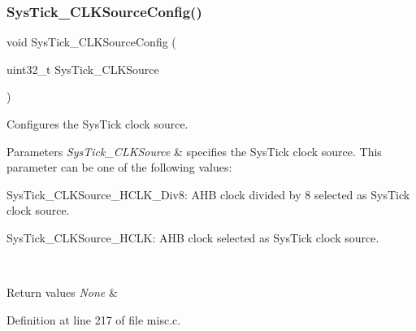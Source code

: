 \subsubsection{\texorpdfstring{Sys\+Tick\+\_\+\+C\+L\+K\+Source\+Config()}{SysTick\_CLKSourceConfig()}}
{\footnotesize\ttfamily void Sys\+Tick\+\_\+\+C\+L\+K\+Source\+Config (\begin{DoxyParamCaption}\item[{uint32\+\_\+t}]{Sys\+Tick\+\_\+\+C\+L\+K\+Source }\end{DoxyParamCaption})}



Configures the Sys\+Tick clock source. 


\begin{DoxyParams}{Parameters}
{\em Sys\+Tick\+\_\+\+C\+L\+K\+Source} & specifies the Sys\+Tick clock source. This parameter can be one of the following values\+: \begin{DoxyItemize}
\item Sys\+Tick\+\_\+\+C\+L\+K\+Source\+\_\+\+H\+C\+L\+K\+\_\+\+Div8\+: A\+HB clock divided by 8 selected as Sys\+Tick clock source. \item Sys\+Tick\+\_\+\+C\+L\+K\+Source\+\_\+\+H\+C\+LK\+: A\+HB clock selected as Sys\+Tick clock source. \end{DoxyItemize}
\\
\hline
\end{DoxyParams}

\begin{DoxyRetVals}{Return values}
{\em None} & \\
\hline
\end{DoxyRetVals}


Definition at line 217 of file misc.\+c.

